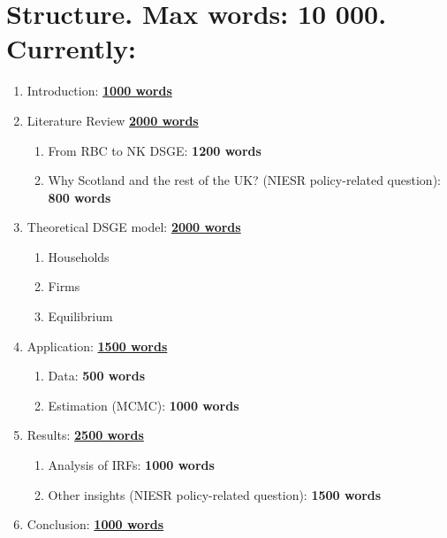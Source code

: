 \section*{Structure. Max words: 10 000. Currently: }

\begin{enumerate}
    \item Introduction: \underline{\textbf{1000 words}}
    \item Literature Review \underline{\textbf{2000 words}}
    \begin{enumerate}
        \item From RBC to NK DSGE: \textbf{1200 words}
        \item Why Scotland and the rest of the UK? (NIESR policy-related question): \textbf{800 words}
    \end{enumerate}
    \item Theoretical DSGE model: \underline{\textbf{2000 words}}
    \begin{enumerate}
        \item Households
        \item Firms
        \item Equilibrium
    \end{enumerate}
    \item Application: \underline{\textbf{1500 words}}
    \begin{enumerate}
        \item Data: \textbf{500 words}
        \item Estimation (MCMC): \textbf{1000 words}
    \end{enumerate}
    \item Results: \underline{\textbf{2500 words}}
    \begin{enumerate}
        \item Analysis of IRFs: \textbf{1000 words}
        \item Other insights (NIESR policy-related question): \textbf{1500 words}
    \end{enumerate}
    \item Conclusion: \underline{\textbf{1000 words}}
\end{enumerate}
\newpage
